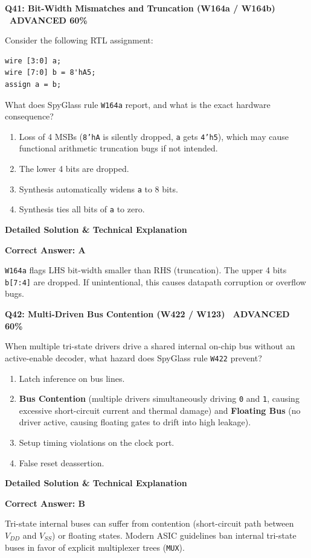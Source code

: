 \documentclass[11pt,a4paper]{article}
\newcommand{\badgeadv}{{\color{white}\colorbox{advred}{\bfseries\sffamily\tiny\ ADVANCED 60\%\ }}}
\newenvironment{qbox}[2]{%
  \begin{mdframed}[style=qstyle]%
  {\bfseries\sffamily\color{primaryblue}#1 \hfill #2}\par\vspace{2pt}%
}{%
  \end{mdframed}%
}
\newenvironment{ansbox}{%
  \begin{mdframed}[style=ansstyle]%
  {\bfseries\sffamily\color{ansgreen}\small Detailed Solution \& Technical Explanation}\par\vspace{2pt}\small%
}{%
  \end{mdframed}%
}
\begin{document}
\begin{qbox}{Q41: Bit-Width Mismatches and Truncation (W164a / W164b)}{\badgeadv}
Consider the following RTL assignment:
\begin{lstlisting}[style=verilogstyle]
wire [3:0] a;
wire [7:0] b = 8'hA5;
assign a = b;
\end{lstlisting}
What does SpyGlass rule \texttt{W164a} report, and what is the exact hardware consequence?
\begin{enumerate}[label=\textbf{\Alph*.}]
  \item Loss of 4 MSBs (\texttt{8'hA} is silently dropped, \texttt{a} gets \texttt{4'h5}), which may cause functional arithmetic truncation bugs if not intended.
  \item The lower 4 bits are dropped.
  \item Synthesis automatically widens \texttt{a} to 8 bits.
  \item Synthesis ties all bits of \texttt{a} to zero.
\end{enumerate}
\end{qbox}
\begin{ansbox}
\textbf{Correct Answer: A}

\texttt{W164a} flags LHS bit-width smaller than RHS (truncation). The upper 4 bits \texttt{b[7:4]} are dropped. If unintentional, this causes datapath corruption or overflow bugs.
\end{ansbox}

\begin{qbox}{Q42: Multi-Driven Bus Contention (W422 / W123)}{\badgeadv}
When multiple tri-state drivers drive a shared internal on-chip bus without an active-enable decoder, what hazard does SpyGlass rule \texttt{W422} prevent?
\begin{enumerate}[label=\textbf{\Alph*.}]
  \item Latch inference on bus lines.
  \item \textbf{Bus Contention} (multiple drivers simultaneously driving \texttt{0} and \texttt{1}, causing excessive short-circuit current and thermal damage) and \textbf{Floating Bus} (no driver active, causing floating gates to drift into high leakage).
  \item Setup timing violations on the clock port.
  \item False reset deassertion.
\end{enumerate}
\end{qbox}
\begin{ansbox}
\textbf{Correct Answer: B}

Tri-state internal buses can suffer from contention (short-circuit path between $V_{DD}$ and $V_{SS}$) or floating states. Modern ASIC guidelines ban internal tri-state buses in favor of explicit multiplexer trees (\texttt{MUX}).
\end{ansbox}
\end{document}
